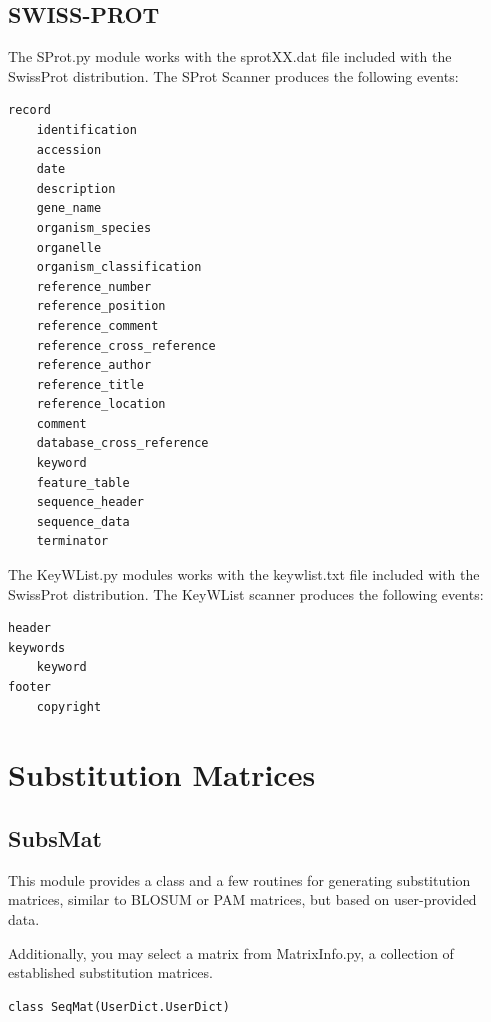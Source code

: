 \documentclass{report}
\begin{document}
\subsection{SWISS-PROT}
The SProt.py module works with the sprotXX.dat file included with the
SwissProt distribution.
The SProt Scanner produces the following events:
\begin{verbatim}
record
    identification
    accession
    date
    description
    gene_name
    organism_species
    organelle
    organism_classification
    reference_number
    reference_position
    reference_comment
    reference_cross_reference
    reference_author
    reference_title
    reference_location
    comment
    database_cross_reference
    keyword
    feature_table
    sequence_header
    sequence_data
    terminator
\end{verbatim}


The KeyWList.py modules works with the keywlist.txt file included with
the SwissProt distribution.
The KeyWList scanner produces the following events:
\begin{verbatim}
header
keywords
    keyword
footer
    copyright
\end{verbatim}

\section{Substitution Matrices}

\subsection{SubsMat}

This module provides a class and a few routines for generating substitution matrices, similar to BLOSUM or PAM matrices, but based on user-provided data.

Additionally, you may select a matrix from MatrixInfo.py, a collection of established substitution matrices.

\begin{verbatim}
class SeqMat(UserDict.UserDict)
\end{verbatim}
\end{document}
